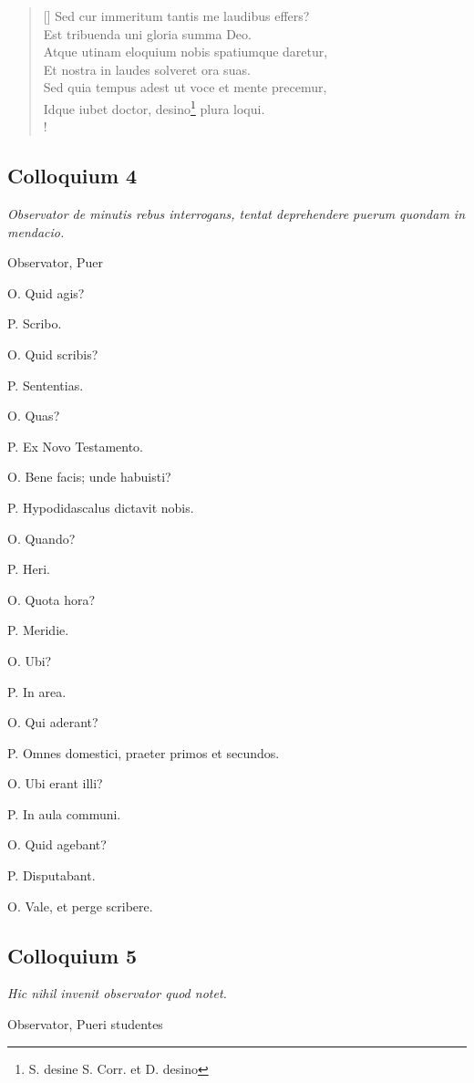 \documentclass{article}
\begin{document}
\begin{verse}[\versewidth]
 Sed cur immeritum tantis me laudibus effers? \\
Est tribuenda uni gloria summa Deo. \\
Atque utinam eloquium nobis spatiumque daretur, \\
Et nostra in laudes solveret ora suas. \\
Sed quia tempus adest ut voce et mente precemur, \\
Idque iubet doctor, desino\footnote{S. desine S. Corr. et D. desino} plura loqui.\\!
\end{verse}

\subsection{Colloquium 4}
\emph{Observator de minutis rebus interrogans, tentat deprehendere puerum quondam in mendacio.}

Observator, Puer

O. Quid agis?

P. Scribo. 

O. Quid scribis? 

P. Sententias.  

O. Quas? 

P. Ex Novo Testamento.  

O. Bene facis; unde habuisti? 

P. Hypodidascalus dictavit nobis.  

O. Quando? 

P. Heri.  

O. Quota hora? 

P. Meridie.  

O. Ubi? 

P. In area.  

O. Qui aderant?

P. Omnes domestici, praeter primos et secundos.

O. Ubi erant illi?

P. In aula communi.

O. Quid agebant?

P. Disputabant.

O. Vale, et perge scribere.

\subsection{Colloquium 5}
\emph{Hic nihil invenit observator quod notet.}

Observator, Pueri studentes
\end{document}
